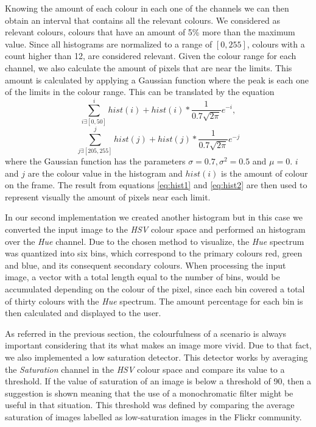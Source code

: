 Knowing the amount of each colour in each one of the channels we can then obtain an interval that contains all the relevant colours. We considered as relevant colours, colours that have an amount of 5\% more than the maximum value. Since all histograms are normalized to a range of $[0,255]$, colours with a count higher than 12, are considered relevant. Given the colour range for each channel, we also calculate the amount of pixels that are near the limits. This amount is calculated by applying a Gaussian function where the peak is each one of the limits in the colour range. This can be translated by the equation
\begin{equation}
	\sum_{i \exists [0,50]}^{i}hist(i) + hist(i)*\frac{1}{0.7\sqrt{2\pi}}e^{-i},
	\label{eq:hist1}
\end{equation}
\begin{equation}
	\sum_{j \exists [205,255]}^{j}hist(j) + hist(j)*\frac{1}{0.7\sqrt{2\pi}}e^{-j}
	\label{eq:hist2}
\end{equation}
where the Gaussian function has the parameters $\sigma = 0.7, \sigma^{2} = 0.5$ and $\mu = 0$. $i$ and $j$ are the colour value in the histogram and $hist(i)$ is the amount of colour on the frame. The result from equations \ref{eq:hist1} and \ref{eq:hist2} are then used to represent visually the amount of pixels near each limit. 

In our second implementation we created another histogram but in this case we converted the input image to the \emph{HSV} colour space and performed an histogram over the \emph{Hue} channel. Due to the chosen method to visualize, the \emph{Hue} spectrum was quantized into six bins, which correspond to the primary colours red, green and blue, and its consequent secondary colours.
When processing the input image, a vector with a total length equal to the number of bins, would be accumulated depending on the colour of the pixel, since each bin covered a total of thirty colours with the \emph{Hue} spectrum. The amount percentage for each bin is then calculated and displayed to the user.

As referred in the previous section, the colourfulness of a scenario is always important considering that its what makes an image more vivid. Due to that fact, we also implemented a low saturation detector. This detector works by averaging the \emph{Saturation} channel in the \emph{HSV} colour space and compare its value to a threshold. If the value of saturation of an image is below a threshold of 90, then a suggestion is shown meaning that the use of a monochromatic filter might be useful in that situation. This threshold was defined by comparing the average saturation of images labelled as low-saturation images in the Flickr community.


